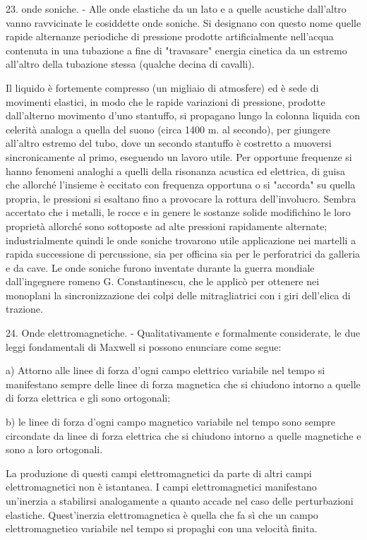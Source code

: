 \documentclass[a4paper]{article}
\begin{document}
23. onde soniche. - Alle onde elastiche da un lato e a quelle acustiche dall'altro vanno ravvicinate le cosiddette onde soniche. Si designano con questo nome quelle rapide alternanze periodiche di pressione prodotte artificialmente nell'acqua contenuta in una tubazione a fine di "travasare" energia cinetica da un estremo all'altro della tubazione stessa (qualche decina di cavalli).

Il liquido è fortemente compresso (un migliaio di atmosfere) ed è sede di movimenti elastici, in modo che le rapide variazioni di pressione, prodotte dall'alterno movimento d'uno stantuffo, si propagano lungo la colonna liquida con celerità analoga a quella del suono (circa 1400 m. al secondo), per giungere all'altro estremo del tubo, dove un secondo stantuffo è costretto a muoversi sincronicamente al primo, eseguendo un lavoro utile. Per opportune frequenze si hanno fenomeni analoghi a quelli della risonanza acustica ed elettrica, di guisa che allorché l'insieme è eccitato con frequenza opportuna o si "accorda" su quella propria, le pressioni si esaltano fino a provocare la rottura dell'involucro. Sembra accertato che i metalli, le rocce e in genere le sostanze solide modifichino le loro proprietà allorché sono sottoposte ad alte pressioni rapidamente alternate; industrialmente quindi le onde soniche trovarono utile applicazione nei martelli a rapida successione di percussione, sia per officina sia per le perforatrici da galleria e da cave. Le onde soniche furono inventate durante la guerra mondiale dall'ingegnere romeno G. Constantinescu, che le applicò per ottenere nei monoplani la sincronizzazione dei colpi delle mitragliatrici con i giri dell'elica di trazione.

24. Onde elettromagnetiche. - Qualitativamente e formalmente considerate, le due leggi fondamentali di Maxwell si possono enunciare come segue:

a) Attorno alle linee di forza d'ogni campo elettrico variabile nel tempo si manifestano sempre delle linee di forza magnetica che si chiudono intorno a quelle di forza elettrica e gli sono ortogonali;

b) le linee di forza d'ogni campo magnetico variabile nel tempo sono sempre circondate da linee di forza elettrica che si chiudono intorno a quelle magnetiche e sono a loro ortogonali.

La produzione di questi campi elettromagnetici da parte di altri campi elettromagnetici non è istantanea. I campi elettromagnetici manifestano un'inerzia a stabilirsi analogamente a quanto accade nel caso delle perturbazioni elastiche. Quest'inerzia elettromagnetica è quella che fa sì che un campo elettromagnetico variabile nel tempo si propaghi con una velocità finita.
\end{document}
